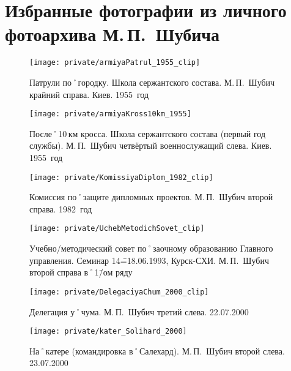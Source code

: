 ﻿\section[Фотографии из фотоархива М.\,П.~Шубича]{Избранные фотографии из личного фотоархива М.\,П.~Шубича}

\makeatletter
\setlength{\@fptop}{0pt}
\makeatother

\begin{figure}[H]
\texttt{[image: private/armiyaPatrul\_1955\_clip]}
\caption{Патрули по˚городку. Школа сержантского состава. М.\,П.~Шубич крайний справа. Киев. 1955~год}
\label{fig:armiyaPatrul_1955}
\end{figure}

\begin{figure}[h]
\texttt{[image: private/armiyaKross10km\_1955]}
\caption{После˚10\,км кросса. Школа сержантского состава (первый год службы). М.\,П.~Шубич четвёртый военнослужащий слева. Киев. 1955~год}
\label{fig:armiyaKross10km_1955}
\end{figure}

\begin{figure}[h]
\texttt{[image: private/KomissiyaDiplom\_1982\_clip]}
\caption{Комиссия по˚защите дипломных проектов. М.\,П.~Шубич второй справа. 1982~год}
\label{fig:KomissiyaDiplom_1982}
\end{figure}

\begin{figure}[h]
\texttt{[image: private/UchebMetodichSovet\_clip]}
\caption{Учебно\-/методический совет по˚заочному образованию Главного управления. Семинар 14\==18.06.1993, Курск-СХИ. М.\,П.~Шубич второй справа в˚1\=/ом ряду}
\label{fig:UchebMetodichSovet}
\end{figure}

\begin{figure}[h]
\texttt{[image: private/DelegaciyaChum\_2000\_clip]}
\caption{Делегация у˚чума. М.\,П.~Шубич третий слева. 22.07.2000}
\label{fig:DelegaciyaChum_2000}
\end{figure}

\begin{figure}[h]
\texttt{[image: private/kater\_Solihard\_2000]}
\caption{На˚катере (командировка в˚Салехард). М.\,П.~Шубич второй слева. 23.07.2000}
\label{fig:kater_Solihard_2000}
\end{figure}

